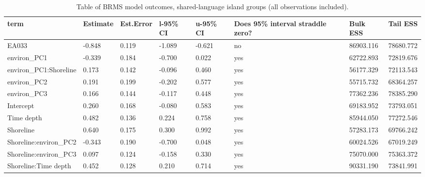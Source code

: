 \begin{table}[ht]
\centering
\begin{tabular}{p{5cm}p{2cm}p{2cm}p{2cm}p{2cm}p{2cm}p{2cm}p{2cm}}
  \toprule
term & Estimate & Est.Error & l-95\% CI & u-95\% CI & Does 95\% interval straddle zero? & Bulk ESS & Tail ESS \\ 
  \midrule
EA033 & -0.848 & 0.119 & -1.089 & -0.621 & no & 86903.116 & 78680.772 \\ 
  environ\_PC1 & -0.339 & 0.184 & -0.700 & 0.022 & yes & 62722.893 & 72819.676 \\ 
  environ\_PC1:Shoreline & 0.173 & 0.142 & -0.096 & 0.460 & yes & 56177.329 & 72113.543 \\ 
  environ\_PC2 & 0.191 & 0.199 & -0.202 & 0.577 & yes & 55715.732 & 68364.257 \\ 
  environ\_PC3 & 0.166 & 0.144 & -0.117 & 0.448 & yes & 77362.236 & 78385.290 \\ 
  Intercept & 0.260 & 0.168 & -0.080 & 0.583 & yes & 69183.952 & 73793.051 \\ 
  Time depth & 0.482 & 0.136 & 0.224 & 0.758 & yes & 85944.050 & 77272.546 \\ 
  Shoreline & 0.640 & 0.175 & 0.300 & 0.992 & yes & 57283.173 & 69766.242 \\ 
  Shoreline:environ\_PC2 & -0.343 & 0.190 & -0.700 & 0.048 & yes & 60024.526 & 67019.249 \\ 
  Shoreline:environ\_PC3 & 0.097 & 0.124 & -0.158 & 0.330 & yes & 75070.000 & 75363.372 \\ 
  Shoreline:Time depth & 0.452 & 0.128 & 0.210 & 0.714 & yes & 90331.190 & 73841.991 \\ 
   \bottomrule
\end{tabular}
\caption{Table of BRMS model outcomes, shared-language island groups (all observations included).} 
\label{BRMS_effects_medium}
\end{table}
